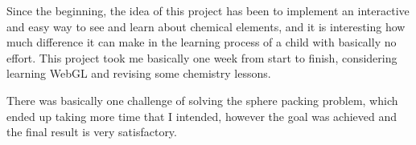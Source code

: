\documentclass{article}
\begin{document}
Since the beginning, the idea of this project has been to implement an interactive and easy way to see and learn about chemical elements, and it is interesting how much difference it can make in the learning process of a child with basically no effort. This project took me basically one week from start to finish, considering learning WebGL and revising some chemistry lessons.

There was basically one challenge of solving the sphere packing problem, which ended up taking more time that I intended, however the goal was achieved and the final result is very satisfactory. 

\end{document}
